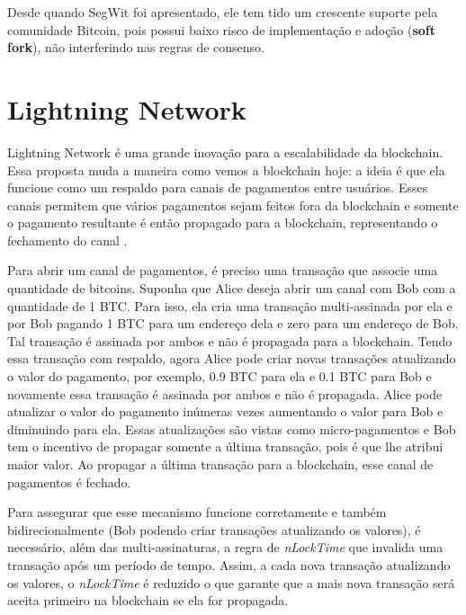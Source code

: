 Desde quando SegWit foi apresentado, ele tem tido um crescente suporte pela comunidade Bitcoin, pois possui baixo risco de implementação e adoção (\textbf{soft fork}), não interferindo nas regras de consenso.

\section{Lightning Network}

Lightning Network é uma grande inovação para a escalabilidade da blockchain. Essa proposta muda a maneira como vemos a blockchain hoje: a ideia é que ela funcione como um respaldo para canais de pagamentos entre usuários. Esses canais permitem que vários pagamentos sejam feitos fora da blockchain e somente o pagamento resultante é então propagado para a blockchain, representando o fechamento do canal \cite{bib:lightning-network}.

Para abrir um canal de pagamentos, é preciso uma transação que associe uma quantidade de bitcoins. Suponha que Alice deseja abrir um canal com Bob com a quantidade de 1 BTC. Para isso, ela cria uma transação multi-assinada por ela e por Bob pagando 1 BTC para um endereço dela e zero para um endereço de Bob. Tal transação é assinada por ambos e não é propagada para a blockchain. Tendo essa transação com respaldo, agora Alice pode criar novas transações atualizando o valor do pagamento, por exemplo, 0.9 BTC para ela e 0.1 BTC para Bob e novamente essa transação é assinada por ambos e não é propagada. Alice pode atualizar o valor do pagamento inúmeras vezes aumentando o valor para Bob e diminuindo para ela. Essas atualizações são vistas como micro-pagamentos e Bob tem o incentivo de propagar somente a última transação, pois é que lhe atribui maior valor. Ao propagar a última transação para a blockchain, esse canal de pagamentos é fechado.

Para assegurar que esse mecanismo funcione corretamente e também bidirecionalmente (Bob podendo criar transações atualizando os valores), é necessário, além das multi-assinaturas, a regra de \textit{nLockTime} que invalida uma transação após um período de tempo. Assim, a cada nova transação atualizando os valores, o \textit{nLockTime} é reduzido o que garante que a mais nova transação será aceita primeiro na blockchain se ela for propagada.

